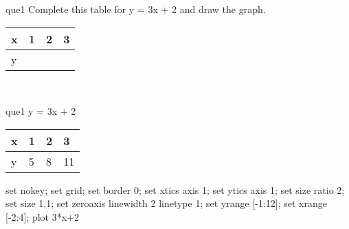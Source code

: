 \documentclass[13.5pt, varwidth=true]{beamer}
\begin{document}
\begin{frame}[shrink=19,fragile]
	\begin{beamercolorbox}[rounded=true, left, shadow=true,wd=14.8cm]{que1}
		 Complete this table for y = 3x + 2 and draw the graph. \\[0.3cm] \renewcommand{\arraystretch}{1.2}\begin{tabular}{|C|C|C|C|} \hline x & 1 & 2 & 3 \\ \hline y & & & \\ \hline \end{tabular}\\[0.3cm]
	\end{beamercolorbox}
\end{frame}
\begin{frame}[shrink=19,fragile]
	\begin{beamercolorbox}[rounded=true, left, shadow=true,wd=14.8cm]{que1}
		y = 3x + 2\renewcommand{\arraystretch}{1.2}\begin{tabular}{|C|C|C|C|} \hline x & 1 & 2 & 3 \\ \hline y & 5 & 8 & 11\\ \hline \end{tabular}\begin{gnuplot}[terminal=pdf] set nokey; set grid; set border 0; set xtics axis 1; set ytics axis 1; set size ratio 2; set size 1,1; set zeroaxis linewidth 2 linetype 1; set yrange [-1:12]; set xrange [-2:4]; plot 3*x+2 \end{gnuplot}
	\end{beamercolorbox}
\end{frame}
\end{document}
